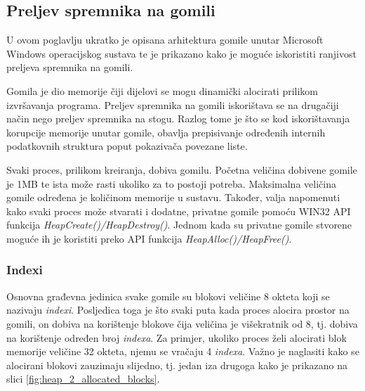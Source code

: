 \documentclass[times, utf8, diplomski, numeric]{fer}
\begin{document}
\subsection{Preljev spremnika na gomili}
\label{scr:heap_overflow}

U ovom poglavlju ukratko je opisana arhitektura gomile unutar
Microsoft Windows operacijskog sustava te je prikazano kako je
moguće iskoristiti ranjivost preljeva spremnika na gomili.

Gomila je dio memorije čiji dijelovi se mogu dinamički alocirati
prilikom izvršavanja programa. Preljev spremnika na gomili
iskorištava se na drugačiji način nego preljev spremnika na
stogu. Razlog tome je što se kod iskorištavanja korupcije
memorije unutar gomile, obavlja prepisivanje određenih internih
podatkovnih struktura poput pokazivača povezane liste.

Svaki proces, prilikom kreiranja, dobiva gomilu. Početna veličina
dobivene gomile je 1MB te ista može rasti ukoliko za to postoji
potreba. Maksimalna veličina gomile određena je količinom				%
memorije u sustavu. Također, valja napomenuti kako svaki proces
može stvarati i dodatne, privatne gomile pomoću WIN32 API
funkcija \emph{HeapCreate()/HeapDestroy()}. Jednom kada su
privatne gomile stvorene moguće ih je koristiti preko API
funkcija \emph{HeapAlloc()/HeapFree()}.

\subsubsection{Indexi}
Osnovna građevna jedinica svake gomile su blokovi veličine 8
okteta koji se nazivaju \emph{indexi}. Posljedica toga je što
svaki puta kada proces alocira prostor na gomili, on dobiva na
korištenje blokove čija veličina je višekratnik od 8, tj. dobiva
na korištenje određen broj \emph{indexa}. Za primjer, ukoliko
proces želi alocirati blok memorije veličine 32 okteta, njemu se
vračaju 4 \emph{indexa}. Važno je naglasiti kako se alocirani			%
blokovi zauzimaju slijedno, tj. jedan iza drugoga kako je
prikazano na slici \ref{fig:heap_2_allocated_blocks}.
\end{document}
